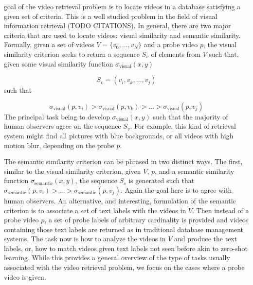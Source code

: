 	
 goal of the video retrieval problem is to locate videos in a database satisfying a given set of criteria. This is a well studied problem in the field of visual information retrieval (TODO CITATIONS). In general, there are two major criteria that are used to locate videos: visual similarity and semantic similarity. Formally, given a set of videos $V = \{v_0, ..., v_N\}$ and a probe video $p$, the visual similarity criterion seeks to return a sequence $S_v$ of elements from $V$ such that, given some visual similarity function $\sigma_{\text{visual}}(x, y)$

\begin{equation*}
    S_v = (v_i, v_k, ..., v_j)
\end{equation*}
such that 

\begin{equation*}
\sigma_{\text{visual}}(p, v_i) > \sigma_{\text{visual}}(p, v_k) > ... > \sigma_{\text{visual}}(p, v_j)
\end{equation*}
The principal task being to develop $\sigma_{\text{visual}}(x, y)$ such that the majority of human observers agree on the sequence $S_v$. For example, this kind of retrieval system might find all pictures with blue backgrounds, or all videos with high motion blur, depending on the probe $p$. 

The semantic similarity criterion can be phrased in two distinct ways. The first, similar to the visual similarity criterion, given $V$, $p$, and a semantic similarity function $\sigma_{\text{semantic}}(x, y)$, the sequence $S_s$ is generated such that $\sigma_{\text{semantic}}(p, v_i) > ... > \sigma_{\text{semantic}}(p, v_j)$. Again the goal here is to agree with human observers. An alternative, and interesting, formulation of the semantic criterion is to associate a set of text labels with the videos in $V$. Then instead of a probe video $p$, a set of probe labels of arbitrary cardinality is provided and videos containing those text labels are returned as in traditional database management systems. The task now is how to analyze the videos in $V$ and produce the text labels, or, how to match videos given text labels not seen before akin to zero-shot learning. While this provides a general overview of the type of tasks usually associated with the video retrieval problem, we focus on the cases where a probe video is given.

